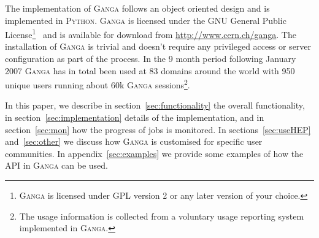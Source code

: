 \documentclass{elsart}
\def\ganga {\textsc{Ganga}\xspace}
\def\python {\textsc{Python}\xspace}
\begin{document}
The implementation of \ganga follows an object oriented design and is
implemented in \python. \ganga is licensed under the GNU General Public
License\footnote{\ganga is licensed under GPL version 2 or any later version
  of your choice.}~\cite{GPL} and is available for download from
\url{http://www.cern.ch/ganga}. The installation of \ganga is trivial and
doesn't require any privileged access or server configuration as part of the
process. In the 9 month period following January 2007 \ganga has in total been
used at 83 domains around the world with 950 unique users running about 60k
\ganga sessions\footnote{The usage information is collected from a voluntary
  usage reporting system implemented in \ganga.}.

In this paper, we describe in section~\ref{sec:functionality} the overall
functionality, in section~\ref{sec:implementation} details of the
implementation, and in section~\ref{sec:mon} how the progress of jobs is
monitored. In sections~\ref{sec:useHEP} and~\ref{sec:other} we discuss how
\ganga is customised for specific user communities. In
appendix~\ref{sec:examples} we provide some examples of how the API in \ganga
can be used.
\end{document}
